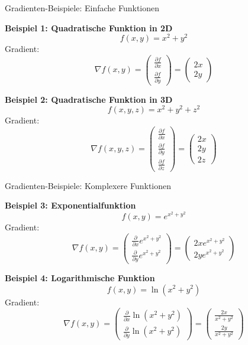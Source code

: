 \documentclass{beamer}
\begin{document}
\begin{frame}{Gradienten-Beispiele: Einfache Funktionen}

    \textbf{Beispiel 1: Quadratische Funktion in 2D}
    \[
    f(x, y) = x^2 + y^2
    \]
    Gradient:
    \[
    \nabla f(x, y) = 
    \begin{pmatrix}
    \frac{\partial f}{\partial x} \\
    \frac{\partial f}{\partial y}
    \end{pmatrix}
    = 
    \begin{pmatrix}
    2x \\
    2y
    \end{pmatrix}
    \]
    
    \textbf{Beispiel 2: Quadratische Funktion in 3D}
    \[
    f(x, y, z) = x^2 + y^2 + z^2
    \]
    Gradient:
    \[
    \nabla f(x, y, z) = 
    \begin{pmatrix}
    \frac{\partial f}{\partial x} \\
    \frac{\partial f}{\partial y} \\
    \frac{\partial f}{\partial z}
    \end{pmatrix}
    = 
    \begin{pmatrix}
    2x \\
    2y \\
    2z
    \end{pmatrix}
    \]
    
    \end{frame}
    
    \begin{frame}{Gradienten-Beispiele: Komplexere Funktionen}
    
    \textbf{Beispiel 3: Exponentialfunktion}
    \[
    f(x, y) = e^{x^2 + y^2}
    \]
    Gradient:
    \[
    \nabla f(x, y) = 
    \begin{pmatrix}
    \frac{\partial}{\partial x} e^{x^2 + y^2} \\
    \frac{\partial}{\partial y} e^{x^2 + y^2}
    \end{pmatrix}
    = 
    \begin{pmatrix}
    2x e^{x^2 + y^2} \\
    2y e^{x^2 + y^2}
    \end{pmatrix}
    \]
    
    \textbf{Beispiel 4: Logarithmische Funktion}
    \[
    f(x, y) = \ln(x^2 + y^2)
    \]
    Gradient:
    \[
    \nabla f(x, y) = 
    \begin{pmatrix}
    \frac{\partial}{\partial x} \ln(x^2 + y^2) \\
    \frac{\partial}{\partial y} \ln(x^2 + y^2)
    \end{pmatrix}
    = 
    \begin{pmatrix}
    \frac{2x}{x^2 + y^2} \\
    \frac{2y}{x^2 + y^2}
    \end{pmatrix}
    \]
    
    \end{frame}
    
\end{document}
